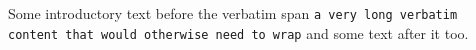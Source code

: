 Some introductory text before the
verbatim span
\verb|a very long verbatim content that would otherwise need to wrap|
and some text after it too.
